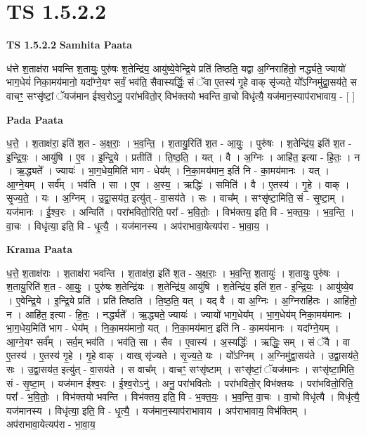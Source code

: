 \documentclass[17pt]{extarticle}
\begin{document}
\section*{ TS 1.5.2.2 }

\textbf{TS 1.5.2.2 } \newline
\textbf{Samhita Paata} \newline

ध॑त्ते श॒ताक्ष॑रा भवन्ति श॒तायुः॒ पुरु॑षः श॒तेन्द्रि॑य॒ आयु॑ष्ये॒वेन्द्रि॒ये प्रति॑ तिष्ठति॒ यद्वा अ॒ग्निराहि॑तो॒ नर्द्ध्यते॒ ज्यायो॑ भाग॒धेयं॑ निका॒मय॑मानो॒ यदा᳚ग्ने॒यꣳ सर्वं॒ भव॑ति॒ सैवास्यर्द्धिः॒ सं ॅवा ए॒तस्य॑ गृ॒हे वाक् सृ॑ज्यते॒ यो᳚ऽग्निमु॑द्वा॒सय॑ते॒ स वाचꣳ॒॒ सꣳसृ॑ष्टां॒ ॅयज॑मान ईश्व॒रोऽनु॒ परा॑भवितो॒र् विभ॑क्तयो भवन्ति वा॒चो विधृ॑त्यै॒ यज॑मान॒स्याप॑राभावाय॒ - [ ] \newline

\textbf{Pada Paata} \newline

ध॒त्ते॒ । श॒ताक्ष॑रा॒ इति॑ श॒त - अ॒क्ष॒राः॒ । भ॒व॒न्ति॒ । श॒तायु॒रिति॑ श॒त - आ॒युः॒ । पुरु॑षः । श॒तेन्द्रि॑य॒ इति॑ श॒त - इ॒न्द्रि॒यः॒ । आयु॑षि । ए॒व । इ॒न्द्रि॒ये । प्रतीति॑ । ति॒ष्ठ॒ति॒ । यत् । वै । अ॒ग्निः । आहि॑त॒ इत्या - हि॒तः॒ । न । ऋ॒द्ध्यते᳚ । ज्यायः॑ । भा॒ग॒धेय॒मिति॑ भाग - धेय᳚म् । नि॒का॒मय॑मान॒ इति॑ नि - का॒मय॑मानः । यत् । आ॒ग्ने॒यम् । सर्व᳚म् । भव॑ति । सा । ए॒व । अ॒स्य॒ । ऋद्धिः॑ । समिति॑ । वै । ए॒तस्य॑ । गृ॒हे । वाक् । सृ॒ज्य॒ते॒ । यः । अ॒ग्निम् । उ॒द्वा॒सय॑त॒ इत्यु॑त् - वा॒सय॑ते । सः । वाच᳚म् । सꣳसृ॑ष्टा॒मिति॒ सं - सृ॒ष्टा॒म् । यज॑मानः । ई॒श्व॒रः । अन्विति॑ । परा॑भवितो॒रिति॒ परा᳚ - भ॒वि॒तोः॒ । विभ॑क्तय॒ इति॒ वि - भ॒क्त॒यः॒ । भ॒व॒न्ति॒ । वा॒चः । विधृ॑त्या॒ इति॒ वि - धृ॒त्यै॒ । यज॑मानस्य । अप॑राभावा॒येत्यप॑रा - भा॒वा॒य॒ ।  \newline


\textbf{Krama Paata} \newline

ध॒त्ते॒ श॒ताक्ष॑राः । श॒ताक्ष॑रा भवन्ति । श॒ताक्ष॑रा॒ इति॑ श॒त - अ॒क्ष॒राः॒ । भ॒व॒न्ति॒ श॒तायुः॑ । श॒तायुः॒ पुरु॑षः । श॒तायु॒रिति॑ श॒त - आ॒युः॒ । पुरु॑षः श॒तेन्द्रि॑यः । श॒तेन्द्रि॑य॒ आयु॑षि । श॒तेन्द्रि॑य॒ इति॑ श॒त - इ॒न्द्रि॒यः॒ । आयु॑ष्ये॒व । ए॒वेन्द्रि॒ये । इ॒न्द्रि॒ये प्रति॑ । प्रति॑ तिष्ठति । ति॒ष्ठ॒ति॒ यत् । यद् वै । वा अ॒ग्निः । अ॒ग्निराहि॑तः । आहि॑तो॒ न । आहि॑त॒ इत्या - हि॒तः॒ । नर्द्ध्यते᳚ । ऋ॒द्ध्यते॒ ज्यायः॑ । ज्यायो॑ भाग॒धेय᳚म् । भा॒ग॒धेय॑म् निका॒मय॑मानः । भा॒ग॒धेय॒मिति॑ भाग - धेय᳚म् । नि॒का॒मय॑मानो॒ यत् । नि॒का॒मय॑मान॒ इति॑ नि - का॒मय॑मानः । यदा᳚ग्ने॒यम् । आ॒ग्ने॒यꣳ सर्व᳚म् । सर्व॒म् भव॑ति । भव॑ति॒ सा । सैव । ए॒वास्य॑ । अ॒स्यर्द्धिः॑ । ऋद्धिः॒ सम् । सं ॅवै । वा ए॒तस्य॑ । ए॒तस्य॑ गृ॒हे । गृ॒हे वाक् । वाख् सृ॑ज्यते । सृ॒ज्य॒ते॒ यः । यो᳚ऽग्निम् । अ॒ग्निमु॑द्वा॒सय॑ते । उ॒द्वा॒सय॑ते॒ सः । उ॒द्वा॒सय॑त॒ इत्यु॑त् - वा॒सय॑ते । स वाच᳚म् । वाचꣳ॒॒ सꣳसृ॑ष्टाम् । सꣳसृ॑ष्टां॒ ॅयज॑मानः । सꣳसृ॑ष्टा॒मिति॒ सं - सृ॒ष्टा॒म् । यज॑मान ईश्व॒रः । ई॒श्व॒रोऽनु॑ । अनु॒ परा॑भवितोः । परा॑भवितो॒र् विभ॑क्तयः । परा॑भवितो॒रिति॒ परा᳚ - भ॒वि॒तोः॒ । विभ॑क्तयो भवन्ति । विभ॑क्तय॒ इति॒ वि - भ॒क्त॒यः॒ । भ॒व॒न्ति॒ वा॒चः । वा॒चो विधृ॑त्यै । विधृ॑त्यै॒ यज॑मानस्य । विधृ॑त्या॒ इति॒ वि - धृ॒त्यै॒ । यज॑मान॒स्याप॑राभावाय । अप॑राभावाय॒ विभ॑क्तिम् । अप॑राभावा॒येत्यप॑रा - भा॒वा॒य॒ \newline
\end{document}
